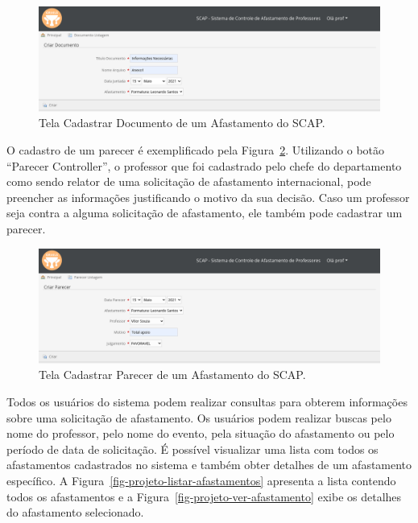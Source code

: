 \begin{figure}[!h]
	\centering
	\includegraphics[scale=0.33]{figuras/fig-projeto-cadastrar-documento} 
	\caption{Tela Cadastrar Documento de um Afastamento do SCAP.}
	\label{fig-projeto-cadastrar-documento}
\end{figure}

O cadastro de um parecer é exemplificado pela Figura~\ref{fig-projeto-cadastrar-parecer}. Utilizando o botão ``Parecer Controller'', o professor que foi cadastrado pelo chefe do departamento como sendo relator de uma solicitação de afastamento internacional, pode preencher as informações justificando o motivo da sua decisão. Caso um professor seja contra a alguma solicitação de afastamento, ele também pode cadastrar um parecer. 

\begin{figure}[!h]
	\centering
	\includegraphics[scale=0.33]{figuras/fig-projeto-cadastrar-parecer} 
	\caption{Tela Cadastrar Parecer de um Afastamento do SCAP.}
	\label{fig-projeto-cadastrar-parecer}
\end{figure}

Todos os usuários do sistema podem realizar consultas para obterem informações sobre uma solicitação de afastamento. Os usuários podem realizar buscas pelo nome do professor, pelo nome do evento, pela situação do afastamento ou pelo período de data de solicitação. É possível visualizar uma lista com todos os afastamentos cadastrados no sistema e também obter detalhes de um afastamento específico. A Figura~\ref{fig-projeto-listar-afastamentos} apresenta a lista contendo todos os afastamentos e a Figura~\ref{fig-projeto-ver-afastamento} exibe os detalhes do afastamento selecionado.  

